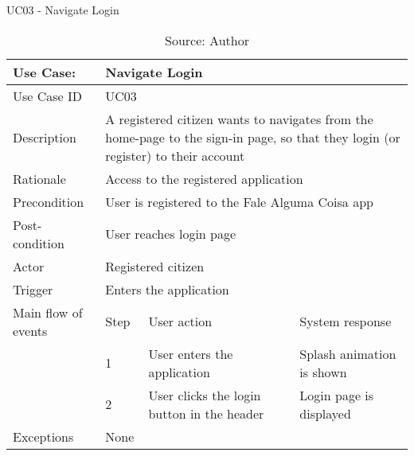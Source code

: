\begin{table}[h]
\centering
\caption{UC03 - Navigate Login}
\label{uc:03}
\begin{tabular}{|p{3cm}|p{1cm}|p{5cm}|p{5cm}|}
\hline
Use Case:       & \multicolumn{3}{p{11cm}|}{Navigate Login} \\ \hline
Use Case ID     & \multicolumn{3}{p{11cm}|}{UC03} \\ \hline
Description     & \multicolumn{3}{p{11cm}|}{A registered citizen wants to navigates from the home-page to the sign-in page, so that they login (or register) to their account} \\ \hline
Rationale       & \multicolumn{3}{p{11cm}|}{Access to the registered application} \\ \hline
Precondition    & \multicolumn{3}{p{11cm}|}{User is registered to the Fale Alguma Coisa app} \\ \hline
Post-condition  & \multicolumn{3}{p{11cm}|}{User reaches login page} \\ \hline
Actor           & \multicolumn{3}{p{11cm}|}{Registered citizen} \\ \hline
Trigger         & \multicolumn{3}{p{11cm}|}{Enters the application} \\ \hline
Main flow of events & Step  & User action & System response \\ \hline
                    & 1     & User enters the application & Splash animation is shown \\ \hline
                    & 2     & User clicks the login button in the header & Login page is displayed \\ \hline
Exceptions      & \multicolumn{3}{p{11cm}|}{None} \\ \hline
\end{tabular}
\caption*{Source: Author}
\end{table}

